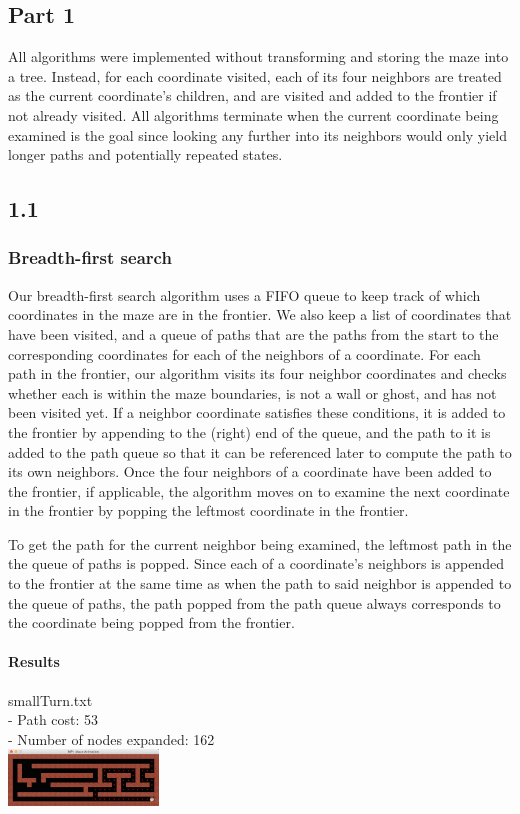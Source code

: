 \begin{multicols*}{2}

\section{Part 1}
All algorithms were implemented without transforming and storing the maze into a tree. Instead, for each coordinate visited, each of its four neighbors are treated as the current coordinate's children, and are visited and added to the frontier if not already visited. All algorithms terminate when the current coordinate being examined is the goal since looking any further into its neighbors would only yield longer paths and potentially repeated states.
\subsection*{1.1}
\subsubsection*{Breadth-first search}
Our breadth-first search algorithm uses a FIFO queue to keep track of which coordinates in the maze are in the frontier. We also keep a list of coordinates that have been visited, and a queue of paths that are the paths from the start to the corresponding coordinates for each of the neighbors of a coordinate. For each path in the frontier, our algorithm visits its four neighbor coordinates and checks whether each is within the maze boundaries, is not a wall or ghost, and has not been visited yet. If a neighbor coordinate satisfies these conditions, it is added to the frontier by appending to the (right) end of the queue, and the path to it is added to the path queue so that it can be referenced later to compute the path to its own neighbors. Once the four neighbors of a coordinate have been added to the frontier, if applicable, the algorithm moves on to examine the next coordinate in the frontier by popping the leftmost coordinate in the frontier.

To get the path for the current neighbor being examined, the leftmost path in the the queue of paths is popped. Since each of a coordinate's neighbors is appended to the frontier at the same time as when the path to said neighbor is appended to the queue of paths, the path popped from the path queue always corresponds to the coordinate being popped from the frontier.

\paragraph{Results}
smallTurn.txt\\
- Path cost: 53\\
- Number of nodes expanded: 162\\
\includegraphics[width=0.3\textwidth]{graphics/smallTurn_bfs.png}


\end{multicols*}
